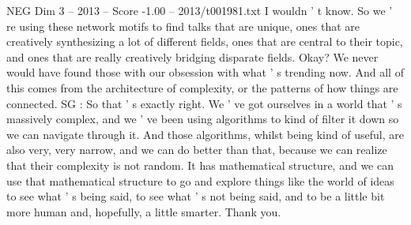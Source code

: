 \begin{textsample}{NEG Dim 3 – 2013 – Score -1.00 – 2013/t001981.txt}
I wouldn ' t know.
So we ' re using these network motifs to find talks that are unique, ones that are creatively synthesizing a lot of different fields, ones that are central to their topic, and ones that are really creatively bridging disparate fields.
Okay?
We never would have found those with our obsession with what ' s trending now.
And all of this comes from the architecture of complexity, or the patterns of how things are connected.
SG : So that ' s exactly right.
We ' ve got ourselves in a world that ' s massively complex, and we ' ve been using algorithms to kind of filter it down so we can navigate through it.
And those algorithms, whilst being kind of useful, are also very, very narrow, and we can do better than that, because we can realize that their complexity is not random.
It has mathematical structure, and we can use that mathematical structure to go and explore things like the world of ideas to see what ' s being said, to see what ' s not being said, and to be a little bit more human and, hopefully, a little smarter.
Thank you.

\end{textsample}
